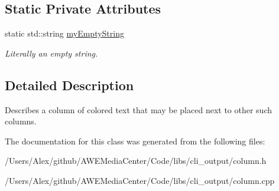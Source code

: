 \subsection*{Static Private Attributes}
\begin{DoxyCompactItemize}
\item 
\hypertarget{class_t_c_o_m_1_1_column_a991cf22b199e97fab7df69b924cd742d}{static std\-::string \hyperlink{class_t_c_o_m_1_1_column_a991cf22b199e97fab7df69b924cd742d}{my\-Empty\-String}}\label{class_t_c_o_m_1_1_column_a991cf22b199e97fab7df69b924cd742d}

\begin{DoxyCompactList}\small\item\em Literally an empty string. \end{DoxyCompactList}\end{DoxyCompactItemize}


\subsection{Detailed Description}
Describes a column of colored text that may be placed next to other such columns. 

The documentation for this class was generated from the following files\-:\begin{DoxyCompactItemize}
\item 
/\-Users/\-Alex/github/\-A\-W\-E\-Media\-Center/\-Code/libs/cli\-\_\-output/column.\-h\item 
/\-Users/\-Alex/github/\-A\-W\-E\-Media\-Center/\-Code/libs/cli\-\_\-output/column.\-cpp\end{DoxyCompactItemize}

